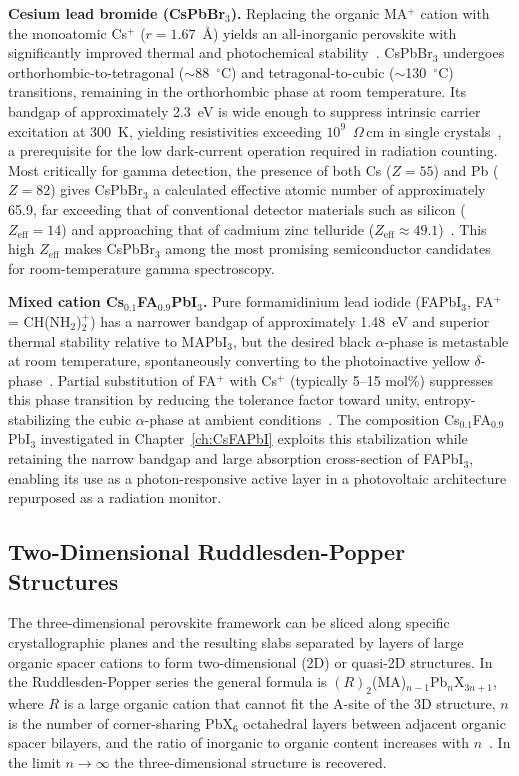 \textbf{Cesium lead bromide (CsPbBr$_3$).}
Replacing the organic MA$^+$ cation with the monoatomic Cs$^+$
($r = 1.67$~\AA) yields an all-inorganic perovskite with significantly
improved thermal and photochemical stability~\cite{Stoumpos2013}.
CsPbBr$_3$ undergoes orthorhombic-to-tetragonal ($\sim$88~$^\circ$C)
and tetragonal-to-cubic ($\sim$130~$^\circ$C) transitions, remaining
in the orthorhombic phase at room temperature.  Its bandgap of
approximately 2.3~eV is wide enough to suppress intrinsic carrier
excitation at 300~K, yielding resistivities exceeding $10^9$~$\Omega$\,cm
in single crystals~\cite{He_NatPhoton_2021}, a prerequisite for the low
dark-current operation required in radiation counting.  Most critically
for gamma detection, the presence of both Cs ($Z = 55$) and Pb ($Z = 82$)
gives CsPbBr$_3$ a calculated effective atomic number of approximately
65.9, far exceeding that of conventional detector materials such as silicon
($Z_{\mathrm{eff}} = 14$) and approaching that of cadmium zinc telluride
($Z_{\mathrm{eff}} \approx 49.1$)~\cite{Springer_CsPbBr3}.  This high
$Z_{\mathrm{eff}}$ makes CsPbBr$_3$ among the most promising semiconductor
candidates for room-temperature gamma spectroscopy.

\textbf{Mixed cation Cs$_{0.1}$FA$_{0.9}$PbI$_3$.}
Pure formamidinium lead iodide (FAPbI$_3$, FA$^+$ = CH(NH$_2$)$_2^+$)
has a narrower bandgap of approximately 1.48~eV and superior thermal
stability relative to MAPbI$_3$, but the desired black
$\alpha$-phase is metastable at room temperature, spontaneously converting
to the photoinactive yellow $\delta$-phase~\cite{Weller2015}.  Partial
substitution of FA$^+$ with Cs$^+$ (typically 5--15 mol\%) suppresses
this phase transition by reducing the tolerance factor toward unity,
entropy-stabilizing the cubic $\alpha$-phase at ambient
conditions~\cite{Yi2016}.  The composition Cs$_{0.1}$FA$_{0.9}$PbI$_3$
investigated in Chapter~\ref{ch:CsFAPbI} exploits this stabilization
while retaining the narrow bandgap and large absorption cross-section of
FAPbI$_3$, enabling its use as a photon-responsive active layer in a
photovoltaic architecture repurposed as a radiation monitor.

\subsection{Two-Dimensional Ruddlesden-Popper Structures}

The three-dimensional perovskite framework can be sliced along specific
crystallographic planes and the resulting slabs separated by layers of
large organic spacer cations to form two-dimensional (2D) or quasi-2D
structures.  In the Ruddlesden-Popper series the general formula is
$(R)_2$(MA)$_{n-1}$Pb$_n$X$_{3n+1}$, where $R$ is a large organic
cation that cannot fit the A-site of the 3D structure, $n$ is the number
of corner-sharing PbX$_6$ octahedral layers between adjacent organic
spacer bilayers, and the ratio of inorganic to organic content increases
with $n$~\cite{Tsai2018}.  In the limit $n \rightarrow \infty$ the
three-dimensional structure is recovered.


